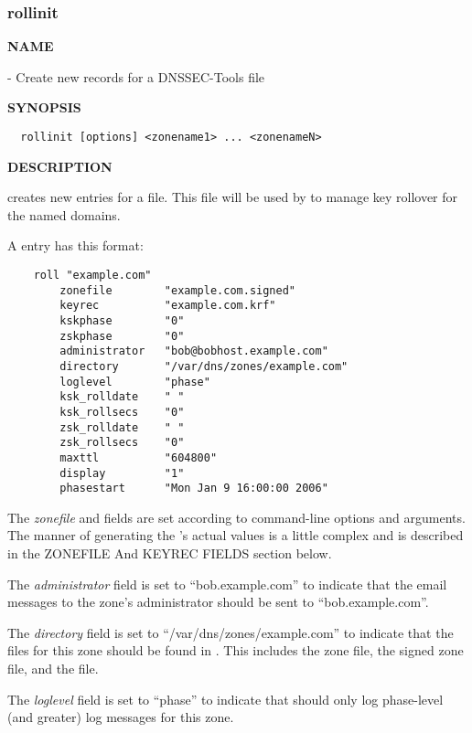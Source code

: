 \clearpage

\subsubsection{rollinit}

{\bf NAME}

 - Create new  records for a DNSSEC-Tools
 file

{\bf SYNOPSIS}

\begin{verbatim}
  rollinit [options] <zonename1> ... <zonenameN>
\end{verbatim}

{\bf DESCRIPTION}

 creates new  entries for a 
file.  This  file will be used by  to manage key
rollover for the named domains.

A  entry has this format:

\begin{verbatim}
    roll "example.com"
        zonefile        "example.com.signed"
        keyrec          "example.com.krf"
        kskphase        "0"
        zskphase        "0"
        administrator   "bob@bobhost.example.com"
        directory       "/var/dns/zones/example.com"
        loglevel        "phase"
        ksk_rolldate    " "
        ksk_rollsecs    "0"
        zsk_rolldate    " "
        zsk_rollsecs    "0"
        maxttl          "604800"
        display         "1"
        phasestart      "Mon Jan 9 16:00:00 2006"
\end{verbatim}

The {\it zonefile} and  fields are set according to command-line
options and arguments.  The manner of generating the 's actual
values is a little complex and is described in the ZONEFILE And KEYREC FIELDS
section below.

The {\it administrator} field is set to ``bob\@bobhost.example.com'' to indicate
that the email messages to the zone's administrator should be sent to
``bob\@bobhost.example.com''.

The {\it directory} field is set to ``/var/dns/zones/example.com''
to indicate that the files for this zone should be found in
.  This includes the zone file,
the signed zone file, and the  file.

The {\it loglevel} field is set to ``phase'' to indicate that 
should only log phase-level (and greater) log messages for this zone.


